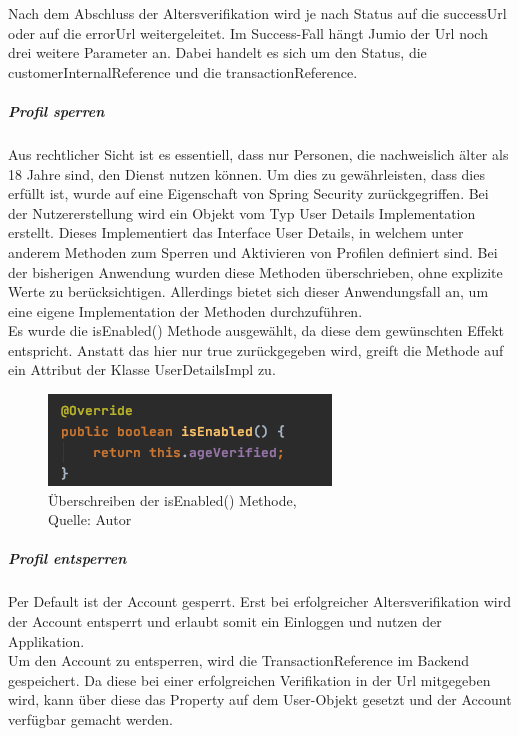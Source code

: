 Nach dem Abschluss der Altersverifikation wird je nach Status auf die successUrl oder auf die errorUrl weitergeleitet. Im Success-Fall hängt Jumio der Url noch drei weitere Parameter an. Dabei handelt es sich um den Status, die customerInternalReference und die transactionReference. \\

\subparagraph{Profil sperren}
Aus rechtlicher Sicht ist es essentiell, dass nur Personen, die nachweislich älter als 18 Jahre sind, den Dienst nutzen können. Um dies zu gewährleisten, dass dies erfüllt ist, wurde auf eine Eigenschaft von Spring Security zurückgegriffen. Bei der Nutzererstellung wird ein Objekt vom Typ User Details Implementation erstellt. Dieses Implementiert das Interface User Details, in welchem unter anderem Methoden zum Sperren und Aktivieren von Profilen definiert sind. Bei der bisherigen Anwendung wurden diese Methoden überschrieben, ohne explizite Werte zu berücksichtigen. Allerdings bietet sich dieser Anwendungsfall an, um eine eigene Implementation der Methoden durchzuführen. \\
Es wurde die isEnabled() Methode ausgewählt, da diese dem gewünschten Effekt entspricht. Anstatt das hier nur true zurückgegeben wird, greift die Methode auf ein Attribut der Klasse UserDetailsImpl zu. 
 \begin{figure}[H]
	\centering
	\includegraphics[scale=0.6]{images/methodIsEnabled.PNG}
	\caption[Überschreiben der isEnabled() Methode]{Überschreiben der isEnabled() Methode,\\ Quelle: Autor}
	\label{img: methodIsEnabled}
\end{figure} 

\subparagraph{Profil entsperren}
Per Default ist der Account gesperrt. Erst bei erfolgreicher Altersverifikation wird der Account entsperrt und erlaubt somit ein Einloggen und nutzen der Applikation. \\
Um den Account zu entsperren, wird die TransactionReference im Backend gespeichert. Da diese bei einer erfolgreichen Verifikation in der Url mitgegeben wird, kann über diese das Property auf dem User-Objekt gesetzt und der Account verfügbar gemacht werden. 

